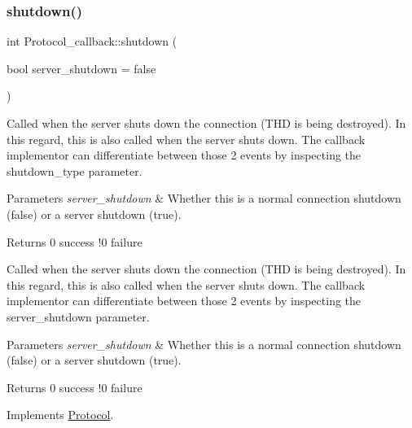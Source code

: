 \subsubsection{\texorpdfstring{shutdown()}{shutdown()}}
{\footnotesize\ttfamily int Protocol\+\_\+callback\+::shutdown (\begin{DoxyParamCaption}\item[{bool}]{server\+\_\+shutdown = {\ttfamily false} }\end{DoxyParamCaption})\hspace{0.3cm}{\ttfamily [virtual]}}

Called when the server shuts down the connection (T\+HD is being destroyed). In this regard, this is also called when the server shuts down. The callback implementor can differentiate between those 2 events by inspecting the shutdown\+\_\+type parameter.


\begin{DoxyParams}{Parameters}
{\em server\+\_\+shutdown} & Whether this is a normal connection shutdown (false) or a server shutdown (true).\\
\hline
\end{DoxyParams}
\begin{DoxyReturn}{Returns}
0 success !0 failure
\end{DoxyReturn}
Called when the server shuts down the connection (T\+HD is being destroyed). In this regard, this is also called when the server shuts down. The callback implementor can differentiate between those 2 events by inspecting the server\+\_\+shutdown parameter.


\begin{DoxyParams}{Parameters}
{\em server\+\_\+shutdown} & Whether this is a normal connection shutdown (false) or a server shutdown (true).\\
\hline
\end{DoxyParams}
\begin{DoxyReturn}{Returns}
0 success !0 failure 
\end{DoxyReturn}


Implements \mbox{\hyperlink{classProtocol_a63405d2f87f50f33ee57fcd4de65ae24}{Protocol}}.

\mbox{\label{classProtocol__callback_a9a65f2ff5bcab0fb5af02b82b205f386}} 
